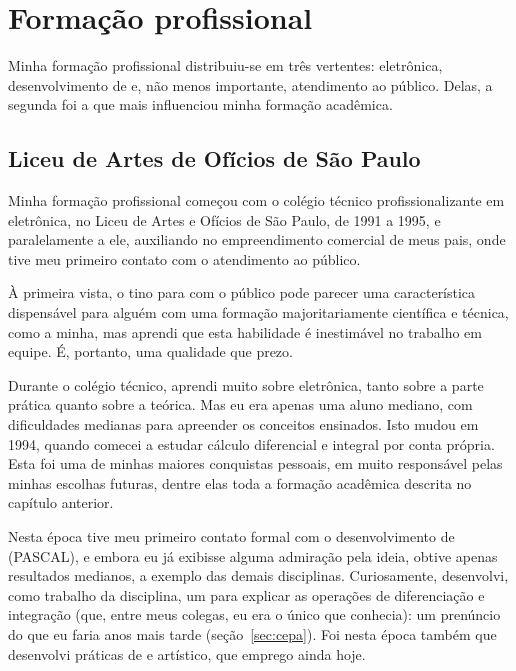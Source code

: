 \chapter{Formação profissional}
\label{cap:formacao-profissional}

Minha formação profissional distribuiu-se em três vertentes: eletrônica, desenvolvimento de  e, não menos importante, atendimento ao público. Delas, a segunda foi a que mais influenciou minha formação acadêmica.

\section{Liceu de Artes de Ofícios de São Paulo}
\label{sec:liceu}

Minha formação profissional começou com o colégio técnico profissionalizante em eletrônica, no Liceu de Artes e Ofícios de São Paulo, de 1991 a 1995, e paralelamente a ele, auxiliando no empreendimento comercial de meus pais, onde tive meu primeiro contato com o atendimento ao público.

À primeira vista, o tino para com o público pode parecer uma característica dispensável para alguém com uma formação majoritariamente científica e técnica, como a minha, mas aprendi que esta habilidade é inestimável no trabalho em equipe. É, portanto, uma qualidade que prezo.

Durante o colégio técnico, aprendi muito sobre eletrônica, tanto sobre a parte prática quanto sobre a teórica. Mas eu era apenas uma aluno mediano, com dificuldades medianas para apreender os conceitos ensinados. Isto mudou em 1994, quando comecei a estudar cálculo diferencial e integral por conta própria. Esta foi uma de minhas maiores conquistas pessoais, em muito responsável pelas minhas escolhas futuras, dentre elas toda a formação acadêmica descrita no capítulo anterior.

Nesta época tive meu primeiro contato formal com o desenvolvimento de  (PASCAL), e embora eu já exibisse alguma admiração pela ideia, obtive apenas resultados medianos, a exemplo das demais disciplinas. Curiosamente, desenvolvi, como trabalho da disciplina, um  para explicar as operações de diferenciação e integração (que, entre meus colegas, eu era o único que conhecia): um prenúncio do que eu faria anos mais tarde (seção~\ref{sec:cepa}). Foi nesta época também que desenvolvi práticas de  e artístico, que emprego ainda hoje.

